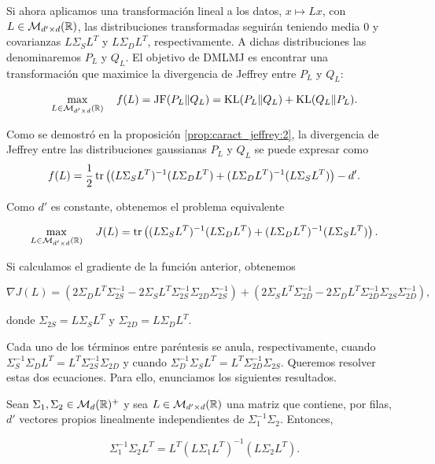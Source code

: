 Si ahora aplicamos una transformación lineal a los datos, $x \mapsto Lx$, con $L \in \mathcal{M}_{d'\times d}(\mathbb{R})$, las distribuciones transformadas seguirán teniendo media 0 y covarianzas $L\Sigma_S L^T$ y $L\Sigma_D L^T$, respectivamente. A dichas distribuciones las denominaremos $P_L$ y $Q_L$. El objetivo de DMLMJ es encontrar una transformación que maximice la divergencia de Jeffrey entre $P_L$ y $Q_L$:

\[ \max_{L \in \mathcal{M}_{d'\times d}(\mathbb{R})} \quad f(L) =  \operatorname{JF}(P_L\|Q_L) = \operatorname{KL}(P_L\|Q_L) + \operatorname{KL}(Q_L\|P_L).\]

Como se demostró en la proposición \ref{prop:caract_jeffrey:2}, la divergencia de Jeffrey entre las distribuciones gaussianas $P_L$ y $Q_L$ se puede expresar como 
\[ f(L) = \frac{1}{2} \operatorname{tr}\left( (L\Sigma_S L^T)^{-1} (L\Sigma_D L^T) + (L \Sigma_D L^T)^{-1} (L \Sigma_S L^T) \right) - d'. \]

Como $d'$ es constante, obtenemos el problema equivalente

\[ \max_{L \in \mathcal{M}_{d'\times d}(\mathbb{R})} \quad J(L) =  \operatorname{tr}\left( (L\Sigma_S L^T)^{-1} (L\Sigma_D L^T) + (L \Sigma_D L^T)^{-1} (L \Sigma_S L^T) \right).\]

Si calculamos el gradiente de la función anterior, obtenemos

\[ \nabla J(L) = \left( 2 \Sigma_D L^T\Sigma_{2S}^{-1} - 2\Sigma_S L^T \Sigma_{2S}^{-1}\Sigma_{2D}\Sigma_{2S}^{-1} \right) + \left( 2\Sigma_S L^T \Sigma_{2D}^{-1} - 2 \Sigma_D L^T \Sigma_{2D}^{-1}\Sigma_{2S} \Sigma_{2D}^{-1} \right),\]

donde $\Sigma_{2S} = L \Sigma_S L^T$ y $\Sigma_{2D} = L\Sigma_D L^T$.

Cada uno de los términos entre paréntesis se anula, respectivamente, cuando $\Sigma_S^{-1} \Sigma_D L^T = L^T \Sigma_{2S}^{-1} \Sigma_{2D}$ y cuando $\Sigma_{D}^{-1}\Sigma_S L^T = L^T \Sigma_{2D}^{-1} \Sigma_{2S}$. Queremos resolver estas dos ecuaciones. Para ello, enunciamos los siguientes resultados.

\begin{thm}

    Sean $\Sigma_1, \Sigma_2 \in \mathcal{M}_d(\mathbb{R})^+$ y sea $L \in \mathcal{M}_{d'\times d}(\mathbb{R})$ una matriz que contiene, por filas, $d'$ vectores propios linealmente independientes de $\Sigma_1^{-1}\Sigma_2$. Entonces,

    \begin{equation} \label{eq:jef:thm1}
        \Sigma_1^{-1}\Sigma_2L^T = L^T(L\Sigma_1L^T)^{-1}(L\Sigma_2L^T).
    \end{equation}
\end{thm}

